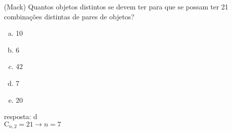 \begin{ex}
(Mack) Quantos objetos distintos se devem ter para que se possam ter 21 combinações distintas de pares de objetos?
   \begin{enumerate}[(a)]
   \item 10
   \item 6
   \item 42
   \item 7
   \item 20
   \end{enumerate}
     \begin{sol}
       resposta: d \\
       $\mathrm{C}_{n,2}=21 \longrightarrow n=7$
     \end{sol}
\end{ex}